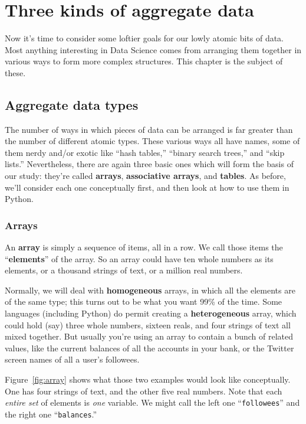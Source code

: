 
\chapter[Three kinds of aggregate data]{\huge Three kinds of aggregate data}
\label{ch:aggregateData}

Now it's time to consider some loftier goals for our lowly atomic bits of data.
Most anything interesting in Data Science comes from arranging them together in
various ways to form more complex structures. This chapter is the subject of
these.

\section{Aggregate data types}

The number of ways in which pieces of data can be arranged is far greater than
the number of different atomic types. These various ways all have names, some
of them nerdy and/or exotic like ``hash tables,'' ``binary search trees,'' and
``skip lists.'' Nevertheless, there are again three basic ones which will form
the basis of our study: they're called \textbf{arrays}, \textbf{associative
arrays}, and \textbf{tables}. As before, we'll consider each one conceptually
first, and then look at how to use them in Python.

\subsection{Arrays}

An \textbf{array} is simply a sequence of items, all in a row. We call those
items the ``\textbf{elements}'' of the array. So an array could have ten whole
numbers as its elements, or a thousand strings of text, or a million real
numbers.

Normally, we will deal with \textbf{homogeneous} arrays, in which all the
elements are of the same type; this turns out to be what you want 99\% of the
time. Some languages (including Python) do permit creating a
\textbf{heterogeneous} array, which could hold (say) three whole numbers,
sixteen reals, and four strings of text all mixed together. But usually you're
using an array to contain a bunch of related values, like the current balances
of all the accounts in your bank, or the Twitter screen names of all a user's
followees.

Figure~\ref{fig:array} shows what those two examples would look like
conceptually. One has four strings of text, and the other five real numbers.
Note that each \textit{entire set} of elements is \textit{one} variable. We
might call the left one ``\texttt{followees}'' and the right one
``\texttt{balances}.''

